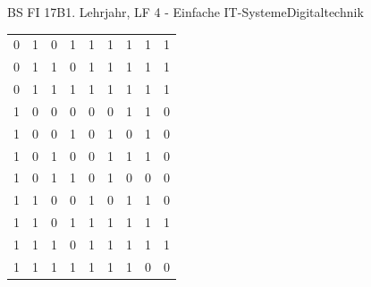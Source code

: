 \documentclass[oneside,openany,headings=optiontotoc,11pt,numbers=noenddot]{scrreprt}
\begin{document}
\begin{worksheet}{BS FI 17B}{1. Lehrjahr, LF 4 - Einfache IT-Systeme}{Digitaltechnik}
\begin{framed}
\begin{tabularx}{0.95\textwidth}{c|c|c|c|c|c|c|c|c}
				0 & 1 & 0 & 1 & 1 & 1 & 1 & 1 & 1\\
				0 & 1 & 1 & 0 & 1 & 1 & 1 & 1 & 1\\
				0 & 1 & 1 & 1 & 1 & 1 & 1 & 1 & 1\\
				1 & 0 & 0 & 0 & 0 & 0 & 1 & 1 & 0\\
				1 & 0 & 0 & 1 & 0 & 1 & 0 & 1 & 0\\
				1 & 0 & 1 & 0 & 0 & 1 & 1 & 1 & 0\\
				1 & 0 & 1 & 1 & 0 & 1 & 0 & 0 & 0\\
				1 & 1 & 0 & 0 & 1 & 0 & 1 & 1 & 0\\
				1 & 1 & 0 & 1 & 1 & 1 & 1 & 1 & 1\\
				1 & 1 & 1 & 0 & 1 & 1 & 1 & 1 & 1\\
				1 & 1 & 1 & 1 & 1 & 1 & 1 & 0 & 0
			\end{tabularx} \\
		\end{framed}
	\end{worksheet}
\end{document}
